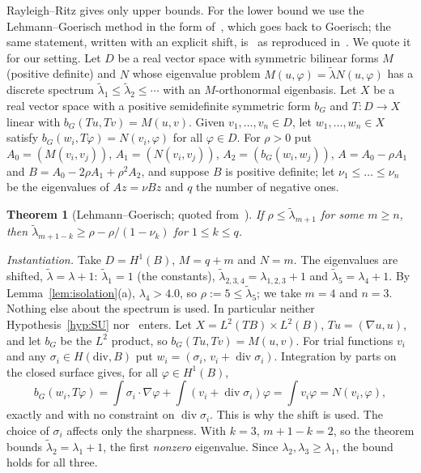 \documentclass[11pt]{amsart}
\newtheorem{theorem}{Theorem}[section]
\theoremstyle{definition}
\theoremstyle{remark}
\begin{document}
Rayleigh--Ritz gives only upper bounds. For the lower bound we use the Lehmann--Goerisch method in
the form of~\cite[\S4.1, Thms.~4.1 and~4.3]{LiuPlum}, which goes back to Goerisch; the same statement,
written with an explicit shift, is~\cite[Thm.~2.1]{BMPW} as reproduced in~\cite[\S2]{Vej18}. We quote it
for our setting. Let $D$ be a real vector space with symmetric bilinear forms $M$ (positive definite)
and $N$ whose eigenvalue problem $M(u,\varphi)=\tilde\lambda N(u,\varphi)$ has a discrete spectrum
$\tilde\lambda_1\le\tilde\lambda_2\le\cdots$ with an $M$-orthonormal eigenbasis. Let $X$ be a real vector space
with a positive semidefinite symmetric form $b_G$ and $T\colon D\to X$ linear with $b_G(Tu,Tv)=M(u,v)$. Given
$v_1,\dots,v_n\in D$, let $w_1,\dots,w_n\in X$ satisfy $b_G(w_i,T\varphi)=N(v_i,\varphi)$ for all $\varphi\in D$.
For $\rho>0$ put $A_0=(M(v_i,v_j))$, $A_1=(N(v_i,v_j))$, $A_2=(b_G(w_i,w_j))$, $A=A_0-\rho A_1$ and
$B=A_0-2\rho A_1+\rho^2A_2$, and suppose $B$ is positive definite; let $\nu_1\le\dots\le\nu_n$ be the
eigenvalues of $Az=\nu Bz$ and $q$ the number of negative ones.

\begin{theorem}[Lehmann--Goerisch; quoted from~\cite{LiuPlum}]\label{thm:LG}
If $\rho\le\tilde\lambda_{m+1}$ for some $m\ge n$, then
$\tilde\lambda_{m+1-k}\ge\rho-\rho/(1-\nu_k)$ for $1\le k\le q$.
\end{theorem}

\emph{Instantiation.} Take $D=H^1(B)$, $M=q+m$ and $N=m$. The eigenvalues are shifted,
$\tilde\lambda=\lambda+1$: $\tilde\lambda_1=1$ (the constants), $\tilde\lambda_{2,3,4}=\lambda_{1,2,3}+1$ and
$\tilde\lambda_5=\lambda_4+1$. By Lemma~\ref{lem:isolation}(a), $\lambda_4>4.0$, so $\rho:=5\le\tilde\lambda_5$; we take
$m=4$ and $n=3$. Nothing else about the spectrum is used. In particular neither
Hypothesis~\ref{hyp:SU} nor~\cite[Lemmas~7.2--7.3]{FBP-K} enters. Let $X=L^2(TB)\times L^2(B)$,
$Tu=(\nabla u,u)$, and let $b_G$ be the $L^2$ product, so $b_G(Tu,Tv)=M(u,v)$. For trial functions $v_i$ and
any $\sigma_i\in H(\mathrm{div},B)$ put $w_i=(\sigma_i,\,v_i+\operatorname{div}\sigma_i)$. Integration by parts on the
closed surface gives, for all $\varphi\in H^1(B)$,
\[
b_G(w_i,T\varphi)=\int\sigma_i\cdot\nabla\varphi+\int(v_i+\operatorname{div}\sigma_i)\varphi=\int v_i\varphi=N(v_i,\varphi),
\]
exactly and with no constraint on $\operatorname{div}\sigma_i$. This is why the shift is used. The choice of
$\sigma_i$ affects only the sharpness. With $k=3$, $m+1-k=2$, so the theorem bounds
$\tilde\lambda_2=\lambda_1+1$, the first \emph{nonzero} eigenvalue. Since $\lambda_2,\lambda_3\ge\lambda_1$, the bound
holds for all three.
\end{document}
